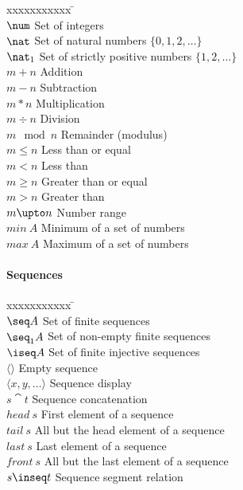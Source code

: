 \begin{tabbing}
xxxxxxxxxxx \= \kill \\ 
$\num$ \> Set of integers \\
$\nat$ \> Set of natural numbers $\{ 0, 1, 2, \dots \}$ \\
$\nat_1$ \> Set of strictly positive numbers $\{ 1, 2, \dots \}$ \\
$m+n$ \> Addition \\
$m-n$ \> Subtraction \\
$m*n$ \> Multiplication \\
$m \div n$ \> Division \\
$m \mod n$ \> Remainder (modulus) \\
$m \leq n$ \> Less than or equal \\
$m < n$ \> Less than \\
$m \geq n$ \> Greater than or equal \\
$m > n$ \> Greater than \\
$m \upto n$ \> Number range \\
$min~A$ \> Minimum of a set of numbers \\
$max~A$ \> Maximum of a set of numbers \\
\end{tabbing}

\paragraph{Sequences}

\begin{tabbing}
xxxxxxxxxxx \= \kill \\ 
$\seq A$ \> Set of finite sequences \\
$\seq_1 A$ \> Set of non-empty finite sequences \\
$\iseq A$ \> Set of finite injective sequences \\
$\langle \rangle$ \> Empty sequence \\
$\langle x, y, \dots \rangle$ \> Sequence display \\
$s \cat t$ \> Sequence concatenation \\
$head~s$ \> First element of a sequence \\
$tail~s$ \> All but the head element of a sequence \\
$last~s$ \> Last element of a sequence \\
$front~s$ \> All but the last element of a sequence \\
$s \inseq t$ \> Sequence segment relation \\
\end{tabbing}

